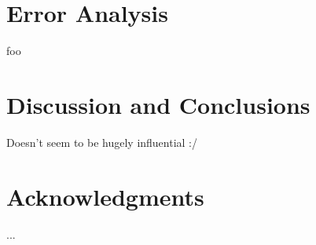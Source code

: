 \documentclass[b5paper]{article}
\begin{document}

\section{Error Analysis}
foo
 
\section{Discussion and Conclusions}

Doesn't seem to be hugely influential :/
\section*{Acknowledgments}

...



\end{document}
